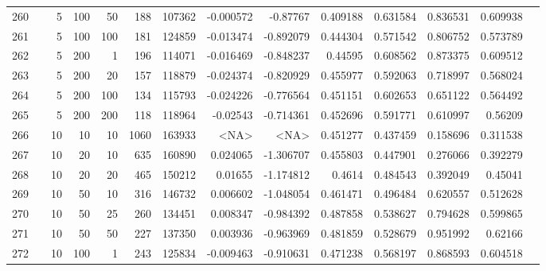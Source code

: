 \begin{longtable}{llrrrrrrrrrrrr}
		260 & &            5 &               100 &           50 &         188 &     107362 & -0.000572 &  -0.87767 &  0.409188 &    0.631584 &       0.836531 &  0.609938 \\
		261 & &            5 &               100 &          100 &         181 &     124859 & -0.013474 & -0.892079 &  0.444304 &    0.571542 &       0.806752 &  0.573789 \\
		262 & &            5 &               200 &            1 &         196 &     114071 & -0.016469 & -0.848237 &   0.44595 &    0.608562 &       0.873375 &  0.609512 \\
		263 & &            5 &               200 &           20 &         157 &     118879 & -0.024374 & -0.820929 &  0.455977 &    0.592063 &       0.718997 &  0.568024 \\
		264 & &            5 &               200 &          100 &         134 &     115793 & -0.024226 & -0.776564 &  0.451151 &    0.602653 &       0.651122 &  0.564492 \\
		265 & &            5 &               200 &          200 &         118 &     118964 &  -0.02543 & -0.714361 &  0.452696 &    0.591771 &       0.610997 &   0.56209 \\
		266 & &           10 &                10 &           10 &           1060 &     163933 &      <NA> &      <NA> &  0.451277 &    0.437459 &       0.158696 &  0.311538 \\
		267 & &           10 &                20 &           10 &         635 &     160890 &  0.024065 & -1.306707 &  0.455803 &    0.447901 &       0.276066 &  0.392279 \\
		268 & &           10 &                20 &           20 &         465 &     150212 &   0.01655 & -1.174812 &    0.4614 &    0.484543 &       0.392049 &   0.45041 \\
		269 & &           10 &                50 &           10 &         316 &     146732 &  0.006602 & -1.048054 &  0.461471 &    0.496484 &       0.620557 &  0.512628 \\
		270 & &           10 &                50 &           25 &         260 &     134451 &  0.008347 & -0.984392 &  0.487858 &    0.538627 &       0.794628 &  0.599865 \\
		271 & &           10 &                50 &           50 &         227 &     137350 &  0.003936 & -0.963969 &  0.481859 &    0.528679 &       0.951992 &   0.62166 \\
		272 & &           10 &               100 &            1 &         243 &     125834 & -0.009463 & -0.910631 &  0.471238 &    0.568197 &       0.868593 &  0.604518 \\

\end{longtable}

